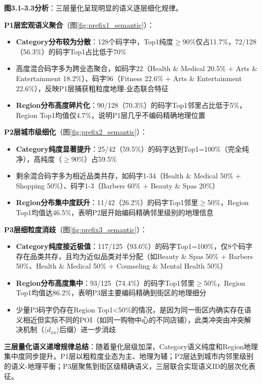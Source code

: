 \textbf{图3.1-3.3分析}：三层量化呈现明显的语义逐层细化规律。

\textbf{P1层宏观语义聚合}（图\ref{fig:prefix1_semantic}）：
\begin{itemize}
    \item \textbf{Category分布较为分散}：128个码字中，Top1纯度$\ge$90\%仅占11.7\%，72/128（56.3\%）的码字Top1占比低于70\%
    \item 高度混合码字多为跨业态聚合，如码字22（Health \& Medical 20.5\% + Arts \& Entertainment 18.2\%）、码字96（Fitness 22.6\% + Arts \& Entertainment 22.6\%），反映P1层捕获粗粒度地理-业态联合特征
    \item \textbf{Region分布高度碎片化}：90/128（70.3\%）的码字Top1邻里占比低于5\%，Region Top1均值仅4.7\%，说明P1层几乎不编码精确地理位置
\end{itemize}

\textbf{P2层城市级细化}（图\ref{fig:prefix2_semantic}）：
\begin{itemize}
    \item \textbf{Category纯度显著提升}：25/42（59.5\%）的码字达到Top1=100\%（完全纯净），高纯度（$\ge$90\%）占59.5\%
    \item 剩余混合码字多为相近品类共存，如码字1-34（Health \& Medical 50\% + Shopping 50\%）、码字1-3（Barbers 60\% + Beauty \& Spas 20\%）
    \item \textbf{Region分布集中度跃升}：11/42（26.2\%）的码字Top1邻里$\ge$50\%，Region Top1均值达46.5\%，表明P2层开始编码精确邻里级别的地理信息
\end{itemize}

\textbf{P3层细粒度消歧}（图\ref{fig:prefix3_semantic}）：
\begin{itemize}
    \item \textbf{Category纯度接近极值}：117/125（93.6\%）的码字Top1=100\%，仅8个码字存在品类共存，且均为近似品类对半分配（如Beauty \& Spas 50\% + Barbers 50\%、Health \& Medical 50\% + Counseling \& Mental Health 50\%）
    \item \textbf{Region分布高度集中}：93/125（74.4\%）的码字Top1邻里$\ge$50\%，Region Top1均值达86.2\%，表明P3层主要编码精确到街区的地理细分
    \item 少量P3码字仍存在Region Top1<50\%的情况，是因为同一街区内确实存在语义相近但实际不同的POI（如同一购物中心的不同店铺），此类冲突由冲突解决机制（$\langle d_{xx} \rangle$后缀）进一步消歧
\end{itemize}

\textbf{三层量化语义递增规律总结}：随着量化层级加深，Category语义纯度和Region地理集中度同步提升。P1层以粗粒度业态为主、地理为辅；P2层达到城市内邻里级别的语义-地理平衡；P3层聚焦到街区级精确语义，三层联合实现语义ID的层次化表征。


